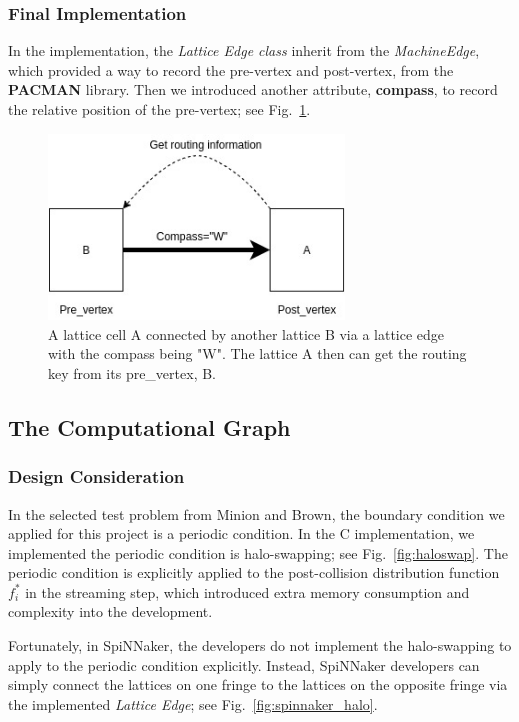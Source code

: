 \subsubsection{Final Implementation}
In the implementation, the \textit{Lattice Edge class} inherit from the \textit{MachineEdge}, which provided a way to record the pre-vertex and post-vertex, from the \textbf{PACMAN} library. Then we introduced another attribute, \textbf{compass}, to record the relative position of the pre-vertex; see Fig.~\ref{fig:edge}.
\begin{figure}[tb]
   \centering
       \includegraphics[width=0.7\textwidth]{figures/edge.jpg}
       \caption{A lattice cell A connected by another lattice B via a lattice edge with the compass being "W". The lattice A then can get the routing key from its pre\_vertex, B.}
       \label{fig:edge}
\end{figure}

\subsection{The Computational Graph} \label{sec:tcg} 
\subsubsection{Design Consideration}
In the selected test problem from Minion and Brown\cite{minion1997performance}, the boundary condition we applied for this project is a periodic condition. In the C implementation, we implemented the periodic condition is halo-swapping; see Fig.~\ref{fig:haloswap}. The periodic condition is explicitly applied to the post-collision distribution function $f_i^{*}$ in the streaming step, which introduced extra memory consumption and complexity into the development.

Fortunately, in SpiNNaker, the developers do not implement the halo-swapping to apply to the periodic condition explicitly. Instead, SpiNNaker developers can simply connect the lattices on one fringe to the lattices on the opposite fringe via the implemented \textit{Lattice Edge}; see Fig.~\ref{fig:spinnaker_halo}.



